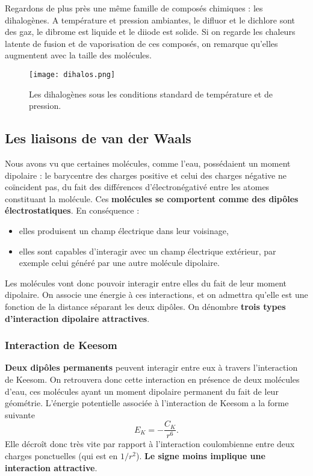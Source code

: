 \documentclass[11pt,a4paper]{report}
\begin{document}
Regardons de plus près une même famille de composés chimiques : les dihalogènes. A température et pression ambiantes, le difluor et le dichlore sont des gaz, le dibrome est liquide et le diiode est solide. Si on regarde les chaleurs latente de fusion et de vaporisation de ces composés, on remarque qu'elles augmentent avec la taille des molécules.\\

\begin{figure}[h!]
	\begin{center}
		\texttt{[image: dihalos.png]}
	\end{center}
	\caption{Les dihalogènes sous les conditions standard de température et de pression.}
\end{figure}

\subsection{Les liaisons de van der Waals}

Nous avons vu que certaines molécules, comme l'eau, possédaient un moment dipolaire : le barycentre des charges positive et celui des charges négative ne coïncident pas, du fait des différences d'électronégativé entre les atomes constituant la molécule. Ces \textbf{molécules se comportent comme des dipôles électrostatiques}. En conséquence :
\begin{itemize}
	\item elles produisent un champ électrique dans leur voisinage,
	\item elles sont capables d'interagir avec un champ électrique extérieur, par exemple celui 				généré par une autre molécule dipolaire.
\end{itemize}

Les molécules vont donc pouvoir interagir entre elles du fait de leur moment dipolaire. On associe une énergie à ces interactions, et on admettra qu'elle est une fonction de la distance séparant les deux dipôles. On dénombre \textbf{trois types d'interaction dipolaire attractives}.

\subsubsection{Interaction de Keesom}

\textbf{Deux dipôles permanents} peuvent interagir entre eux à travers l'interaction de Keesom. On retrouvera donc cette interaction en présence de deux molécules d'eau, ces molécules ayant un moment dipolaire permanent du fait de leur géométrie. L'énergie potentielle associée à l'interaction de Keesom a la forme suivante
\begin{equation}
	E_K = - \frac{C_K}{r^6}.
\end{equation}
Elle décroît donc très vite par rapport à l'interaction coulombienne entre deux charges ponctuelles (qui est en $1/r^2$). \textbf{Le signe moins implique une interaction attractive}.
\end{document}
